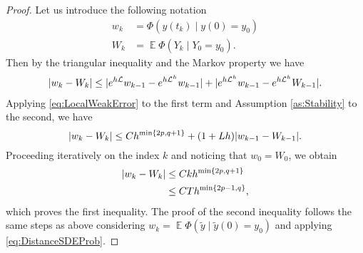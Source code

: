 \documentclass{siamart1116}
\numberwithin{theorem}{section}
\DeclarePairedDelimiter{\abs}{\lvert}{\rvert}
\newcommand{\diffL}{\mathcal{L}}
\newcommand{\E}{\operatorname{\mathbb{E}}}
\begin{document}
\begin{proof} Let us introduce the following notation
	\begin{equation}
	\begin{aligned}
		w_k &= \Phi(y(t_k) \mid y(0) = y_0)\\
		W_k &= \E\Phi(Y_k \mid Y_0 = y_0).
	\end{aligned}
	\end{equation}
	Then by the triangular inequality and the Markov property we have
	\begin{equation}
	\begin{aligned}
		\abs{w_k - W_k} \leq \abs{e^{h\diffL}w_{k-1} - e^{h\diffL^h}w_{k-1}} + \abs{e^{h\diffL^h}w_{k-1} - e^{h\diffL^h}W_{k-1}}.
	\end{aligned}
	\end{equation}
	Applying \eqref{eq:LocalWeakError} to the first term and Assumption \ref{as:Stability} to the second, we have
	\begin{equation}
		\abs{w_k - W_k} \leq Ch^{\min\{2p, q + 1\}} + (1 + Lh)\abs{w_{k-1} - W_{k-1}}.
	\end{equation} 
	Proceeding iteratively on the index $k$ and noticing that $w_0 = W_0$, we obtain
	\begin{equation}
	\begin{aligned}
		\abs{w_k - W_k} &\leq C k h^{\min\{2p, q + 1\}}\\
		&\leq C T h^{\min\{2p - 1, q\}},	
	\end{aligned}
	\end{equation}
	which proves the first inequality. The proof of the second inequality follows the same steps as above considering $w_k = \E\Phi(\tilde y\mid \tilde y(0) = y_0)$ and applying \eqref{eq:DistanceSDEProb}. 
\end{proof}
\end{document}

